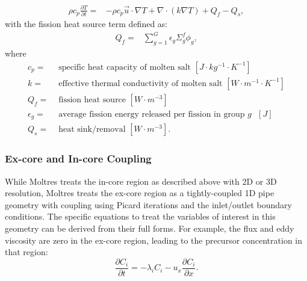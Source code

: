 \begin{equation}
\begin{split}
    \rho c_{p} \frac{\partial T}{\partial t} =& - \rho c_p \vec{u}
    \cdot \nabla T + \nabla \cdot \left(k \nabla T \right) + Q_f - Q_s,
    \label{eq:temp}
\end{split}
\end{equation}
with the fission heat source term defined as:
\begin{equation}
\begin{split}
    Q_f =& \sum^G_{g=1} \epsilon_g \Sigma_g^f \phi_g,
    \label{eq:heat-source}
\end{split}
\end{equation}
where
\begin{align}
    c_p =& \text{ specific heat capacity of molten salt $[J \cdot kg^{-1} \cdot K^{-1}]$} \nonumber \\
    k =& \text{ effective thermal conductivity of molten salt $[W \cdot m^{-1} \cdot K^{-1}]$} \nonumber \\
    Q_f =& \text{ fission heat source $[W \cdot m^{-3}]$} \nonumber \\
    \epsilon_g =& \text{ average fission energy released per fission in group
    $g$ $[J]$} \nonumber \\
    Q_s =& \text{ heat sink/removal $[W \cdot m^{-3}]$.} \nonumber
\end{align}

\subsubsection{Ex-core and In-core Coupling}

While Moltres treats the in-core region as described above with 2D or 3D resolution, Moltres treats the ex-core region as a tightly-coupled 1D pipe geometry with coupling using Picard iterations and the inlet/outlet boundary conditions.
The specific equations to treat the variables of interest in this geometry can be derived from their full forms.
For example, the flux and eddy viscosity are zero in the ex-core region, leading to the precursor concentration in that region:
\begin{equation}
    \frac{\partial C_i}{\partial t} = - \lambda_i C_i - u_x \frac{\partial C_i}{\partial x}.
    \label{eq:prec-conc-ex}
\end{equation}